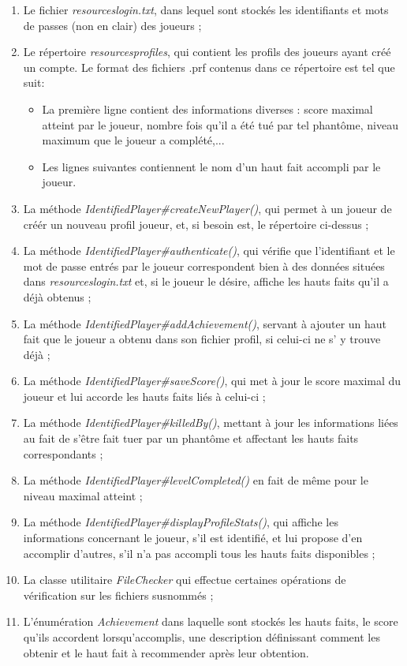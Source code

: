 \documentclass[12pt, openany]{report}
\begin{document}
\begin{enumerate}
\item Le fichier \mbox{\textit{resources\\login.txt}}, dans lequel sont stockés les identifiants et mots de passes (non en clair) des joueurs ;
\item Le répertoire \mbox{\textit{resources\\profiles\\}}, qui contient les profils des joueurs ayant créé un compte.
Le format des fichiers .prf contenus dans ce répertoire est tel que suit: 
\begin{itemize}
\item La première ligne contient des informations diverses : score maximal atteint par le joueur, nombre fois qu'il a été tué par tel phantôme, niveau maximum que le joueur a complété,...
\item Les lignes suivantes contiennent le nom d'un haut fait accompli par le joueur.
\end{itemize}
\item La méthode \mbox{\textit{IdentifiedPlayer\#createNewPlayer()}}, qui permet à un joueur de créér un nouveau profil joueur, et, si besoin est, le répertoire ci-dessus ;
\item La méthode \mbox{\textit{IdentifiedPlayer\#authenticate()}}, qui vérifie que l'identifiant et le mot de passe entrés par le joueur correspondent bien à des données situées dans \mbox{\textit{resources\\login.txt}} et, si le joueur le désire, affiche les hauts faits qu'il a déjà obtenus ;
\item La méthode \mbox{\textit{IdentifiedPlayer\#addAchievement()}}, servant à ajouter un haut fait que le joueur a obtenu dans son fichier profil, si celui-ci ne s' y trouve déjà ;
\item La méthode \mbox{\textit{IdentifiedPlayer\#saveScore()}}, qui met à jour le score maximal du joueur et lui accorde les hauts faits liés à celui-ci ;
\item La méthode \mbox{\textit{IdentifiedPlayer\#killedBy()}}, mettant à jour les informations liées au fait de s'être fait tuer par un phantôme et affectant les hauts faits correspondants ;
\item La méthode \mbox{\textit{IdentifiedPlayer\#levelCompleted()}} en fait de même pour le niveau maximal atteint ;
\item La méthode \mbox{\textit{IdentifiedPlayer\#displayProfileStats()}}, qui affiche les informations concernant le joueur, s'il est identifié, et lui propose d'en accomplir d'autres, s'il n'a pas accompli tous les hauts faits disponibles ;
\item La classe utilitaire \mbox{\textit{FileChecker}} qui effectue certaines opérations de vérification sur les fichiers susnommés ;
\item L'énumération \mbox{\textit{Achievement}} dans laquelle sont stockés les hauts faits, le score qu'ils accordent lorsqu'accomplis, une description définissant comment les obtenir et le haut fait à recommender après leur obtention.
\end{enumerate}
\end{document}
